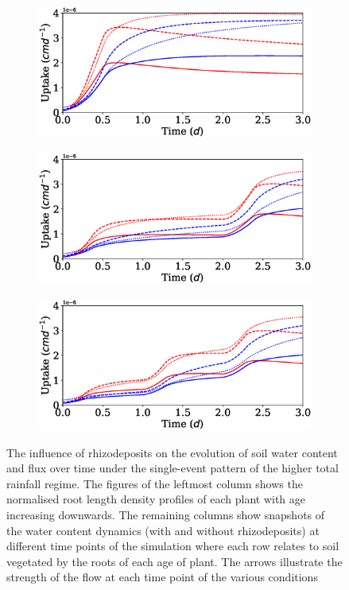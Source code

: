 \documentclass[11pt,a4paper]{article}
\numberwithin{equation}{section}
\begin{document}
\begin{figure}
	\begin{subfigure}{0.32\textwidth}
		\includegraphics[width = \linewidth, keepaspectratio] {up_ppat1ptot0_28.eps}
		\caption{}
	\end{subfigure}
	\begin{subfigure}{0.32\textwidth}
		\includegraphics[width = \linewidth, keepaspectratio] {up_ppat2ptot0_28.eps}
		\caption{}
	\end{subfigure}
	\begin{subfigure}{0.32\textwidth}
		\includegraphics[width = \linewidth, keepaspectratio] {up_ppat3ptot0_28.eps}
		\caption{}
	\end{subfigure}
	\caption{The influence of rhizodeposits on the evolution of soil water content and flux over time under the single-event pattern of the higher total rainfall regime. The figures of the leftmost column shows the normalised root length density profiles of each plant with age increasing downwards. The remaining columns show snapshots of the water content dynamics (with and without rhizodeposits) at different time points of the simulation where each row relates to soil vegetated by the roots of each age of plant. The arrows illustrate the strength of the flow at each time point of the various conditions}
	\label{figure: Madrid_precip_evap_up}
\end{figure}
\end{document}
